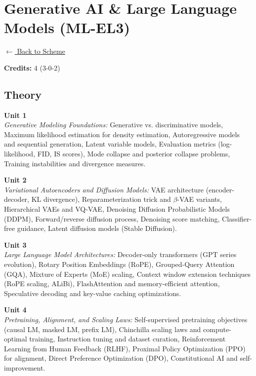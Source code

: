 \section*{Generative AI \& Large Language Models (ML-EL3)}
\label{elec:ML_3}

\noindent \small{\hyperref[main:scheme]{$\leftarrow$ Back to Scheme}} \vspace{0.5cm}

\noindent \textbf{Credits:} 4 (3-0-2)

\subsection*{Theory}
\noindent\textbf{Unit 1} \\
\textit{Generative Modeling Foundations:} Generative vs. discriminative models, Maximum likelihood estimation for density estimation, Autoregressive models and sequential generation, Latent variable models, Evaluation metrics (log-likelihood, FID, IS scores), Mode collapse and posterior collapse problems, Training instabilities and divergence measures.

\vspace{0.3cm}

\noindent\textbf{Unit 2} \\
\textit{Variational Autoencoders and Diffusion Models:} VAE architecture (encoder-decoder, KL divergence), Reparameterization trick and $\beta$-VAE variants, Hierarchical VAEs and VQ-VAE, Denoising Diffusion Probabilistic Models (DDPM), Forward/reverse diffusion process, Denoising score matching, Classifier-free guidance, Latent diffusion models (Stable Diffusion).

\vspace{0.3cm}

\noindent\textbf{Unit 3} \\
\textit{Large Language Model Architectures:} Decoder-only transformers (GPT series evolution), Rotary Position Embeddings (RoPE), Grouped-Query Attention (GQA), Mixture of Experts (MoE) scaling, Context window extension techniques (RoPE scaling, ALiBi), FlashAttention and memory-efficient attention, Speculative decoding and key-value caching optimizations.

\vspace{0.3cm}

\noindent\textbf{Unit 4} \\
\textit{Pretraining, Alignment, and Scaling Laws:} Self-supervised pretraining objectives (causal LM, masked LM, prefix LM), Chinchilla scaling laws and compute-optimal training, Instruction tuning and dataset curation, Reinforcement Learning from Human Feedback (RLHF), Proximal Policy Optimization (PPO) for alignment, Direct Preference Optimization (DPO), Constitutional AI and self-improvement.

